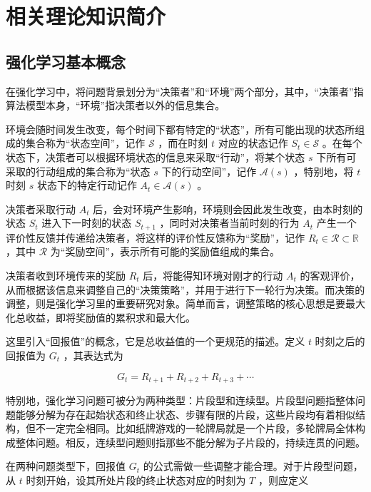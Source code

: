 
\chapter{相关理论知识简介}

\section{强化学习基本概念}

在强化学习中，将问题背景划分为“决策者”和“环境”两个部分，其中，“决策者”指算法模型本身，“环境”指决策者以外的信息集合。

环境会随时间发生改变，每个时间下都有特定的“状态”，所有可能出现的状态所组成的集合称为“状态空间”，记作 $\mathcal S$ ，而在时刻 $t$ 对应的状态记作 $S_t\in \mathcal S$ 。在每个状态下，决策者可以根据环境状态的信息来采取“行动”，将某个状态 $s$ 下所有可采取的行动组成的集合称为“状态 $s$ 下的行动空间”，记作 $\mathcal{A}(s)$ ，特别地，将 $t$ 时刻 $s$ 状态下的特定行动记作 $A_t\in\mathcal{A}(s)$ 。

决策者采取行动 $A_t$ 后，会对环境产生影响，环境则会因此发生改变，由本时刻的状态 $S_t$ 进入下一时刻的状态 $S_{t+1}$ ，同时对决策者当前时刻的行为 $A_t$ 产生一个评价性反馈并传递给决策者，将这样的评价性反馈称为“奖励”，记作 $R_{t}\in\mathcal{R}\subset\mathbb{R}$ ，其中 $\mathcal{R}$ 为“奖励空间”，表示所有可能的奖励值组成的集合。

决策者收到环境传来的奖励 $R_{t}$ 后，将能得知环境对刚才的行动 $A_t$ 的客观评价，从而根据该信息来调整自己的“决策策略”，并用于进行下一轮行为决策。而决策的调整，则是强化学习里的重要研究对象。简单而言，调整策略的核心思想是要最大化总收益，即将奖励值的累积求和最大化。

这里引入“回报值”的概念，它是总收益值的一个更规范的描述。定义 $t$ 时刻之后的回报值为 $G_t$ ，其表达式为

\begin{equation}
G_t = R_{t+1}+R_{t+2}+R_{t+3}+\cdots
\end{equation}

特别地，强化学习问题可被分为两种类型：片段型和连续型。片段型问题指整体问题能够分解为存在起始状态和终止状态、步骤有限的片段，这些片段均有着相似结构，但不一定完全相同。比如纸牌游戏的一轮牌局就是一个片段，多轮牌局全体构成整体问题。相反，连续型问题则指那些不能分解为子片段的，持续连贯的问题。

在两种问题类型下，回报值 $G_t$ 的公式需做一些调整才能合理。对于片段型问题，从 $t$ 时刻开始，设其所处片段的终止状态对应的时刻为 $T$ ，则应定义

